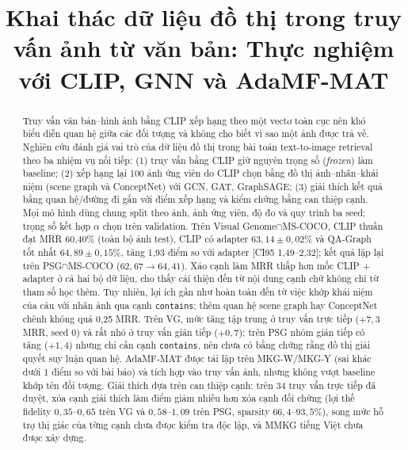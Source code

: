 \documentclass[conference]{IEEEtran}
\begin{document}
\raggedbottom

\title{Khai thác dữ liệu đồ thị trong truy vấn ảnh từ văn bản: Thực nghiệm với CLIP, GNN và AdaMF-MAT}

\author{
}

\maketitle

\begin{abstract}
Truy vấn văn bản--hình ảnh bằng CLIP xếp hạng theo một vectơ toàn cục nên khó biểu diễn quan hệ giữa các đối tượng và không cho biết vì sao một ảnh được trả về. Nghiên cứu đánh giá vai trò của dữ liệu đồ thị trong bài toán text-to-image retrieval theo ba nhiệm vụ nối tiếp: (1) truy vấn bằng CLIP giữ nguyên trọng số (\emph{frozen}) làm baseline; (2) xếp hạng lại 100 ảnh ứng viên do CLIP chọn bằng đồ thị ảnh--nhãn--khái niệm (scene graph và ConceptNet) với GCN, GAT, GraphSAGE; (3) giải thích kết quả bằng quan hệ/đường đi gắn với điểm xếp hạng và kiểm chứng bằng can thiệp cạnh. Mọi mô hình dùng chung split theo ảnh, ảnh ứng viên, độ đo và quy trình ba seed; trọng số kết hợp $\alpha$ chọn trên validation.
Trên Visual Genome$\cap$MS-COCO, CLIP thuần đạt MRR 60,40\% (toàn bộ ảnh test), CLIP có adapter $63{,}14\pm0{,}02\%$ và QA-Graph tốt nhất $64{,}89\pm0{,}15\%$, tăng 1,93 điểm so với adapter [CI95 1,49--2,32]; kết quả lặp lại trên PSG$\cap$MS-COCO ($62{,}67\to64{,}41$). Xáo cạnh làm MRR thấp hơn mốc CLIP + adapter ở cả hai bộ dữ liệu, cho thấy cải thiện đến từ nội dung cạnh chứ không chỉ từ tham số học thêm. Tuy nhiên, lợi ích gần như hoàn toàn đến từ việc khớp khái niệm của câu với nhãn ảnh qua cạnh \texttt{contains}; thêm quan hệ scene graph hay ConceptNet chênh không quá 0,25 MRR. Trên VG, mức tăng tập trung ở truy vấn trực tiếp ($+7{,}3$ MRR, seed 0) và rất nhỏ ở truy vấn gián tiếp ($+0{,}7$); trên PSG nhóm gián tiếp có tăng ($+1{,}4$) nhưng chỉ cần cạnh \texttt{contains}, nên chưa có bằng chứng rằng đồ thị giải quyết suy luận quan hệ. AdaMF-MAT được tái lập trên MKG-W/MKG-Y (sai khác dưới 1 điểm so với bài báo) và tích hợp vào truy vấn ảnh, nhưng không vượt baseline khớp tên đối tượng. Giải thích dựa trên can thiệp cạnh: trên 34 truy vấn trực tiếp đã duyệt, xóa cạnh giải thích làm điểm giảm nhiều hơn xóa cạnh đối chứng (lợi thế fidelity $0{,}35$--$0{,}65$ trên VG và $0{,}58$--$1{,}09$ trên PSG, sparsity $66{,}4$--$93{,}5\%$), song mức hỗ trợ thị giác của từng cạnh chưa được kiểm tra độc lập, và MMKG tiếng Việt chưa được xây dựng.
\end{abstract}
\end{document}
